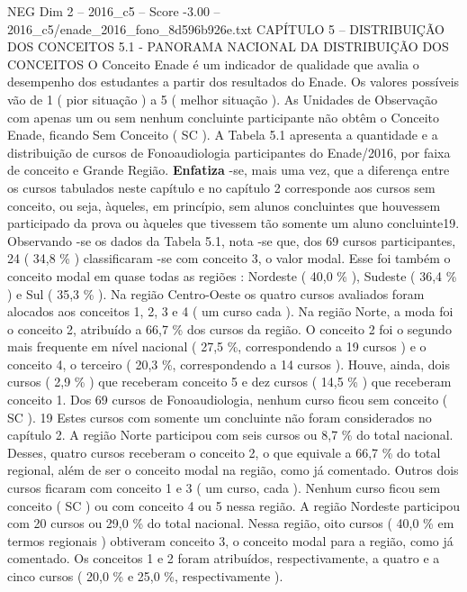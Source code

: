 \begin{textsample}{NEG Dim 2 – 2016\_c5 – Score -3.00 – 2016\_c5/enade\_2016\_fono\_8d596b926e.txt}  \label{ex:f2_neg_036}
CAPÍTULO 5 – DISTRIBUIÇÃO DOS CONCEITOS 5.1 - PANORAMA NACIONAL DA DISTRIBUIÇÃO DOS CONCEITOS O Conceito Enade é um indicador de qualidade que avalia o desempenho dos estudantes a partir dos resultados do Enade.
Os valores possíveis vão de 1 ( pior situação ) a 5 ( melhor situação ).
As Unidades de Observação com apenas um ou sem nenhum concluinte participante não obtêm o Conceito Enade, ficando Sem Conceito ( SC ).
A Tabela 5.1 apresenta a quantidade e a distribuição de cursos de Fonoaudiologia participantes do Enade/2016, por faixa de conceito e Grande Região. \textbf{Enfatiza} -se, mais uma vez, que a diferença entre os cursos tabulados neste capítulo e no capítulo 2 corresponde aos cursos sem conceito, ou seja, àqueles, em princípio, sem alunos concluintes que houvessem participado da prova ou àqueles que tivessem tão somente um aluno concluinte19.
Observando -se os dados da Tabela 5.1, nota -se que, dos 69 cursos participantes, 24 ( 34,8 \% ) classificaram -se com conceito 3, o valor modal.
Esse foi também o conceito modal em quase todas as regiões : Nordeste ( 40,0 \% ), Sudeste ( 36,4 \% ) e Sul ( 35,3 \% ).
Na região Centro-Oeste os quatro cursos avaliados foram alocados aos conceitos 1, 2, 3 e 4 ( um curso cada ).
Na região Norte, a moda foi o conceito 2, atribuído a 66,7 \% dos cursos da região.
O conceito 2 foi o segundo mais frequente em nível nacional ( 27,5 \%, correspondendo a 19 cursos ) e o conceito 4, o terceiro ( 20,3 \%, correspondendo a 14 cursos ).
Houve, ainda, dois cursos ( 2,9 \% ) que receberam conceito 5 e dez cursos ( 14,5 \% ) que receberam conceito 1.
Dos 69 cursos de Fonoaudiologia, nenhum curso ficou sem conceito ( SC ). 19 Estes cursos com somente um concluinte não foram considerados no capítulo 2.
A região Norte participou com seis cursos ou 8,7 \% do total nacional.
Desses, quatro cursos receberam o conceito 2, o que equivale a 66,7 \% do total regional, além de ser o conceito modal na região, como já comentado.
Outros dois cursos ficaram com conceito 1 e 3 ( um curso, cada ).
Nenhum curso ficou sem conceito ( SC ) ou com conceito 4 ou 5 nessa região.
A região Nordeste participou com 20 cursos ou 29,0 \% do total nacional.
Nessa região, oito cursos ( 40,0 \% em termos regionais ) obtiveram conceito 3, o conceito modal para a região, como já comentado.
Os conceitos 1 e 2 foram atribuídos, respectivamente, a quatro e a cinco cursos ( 20,0 \% e 25,0 \%, respectivamente ).

\end{textsample}
